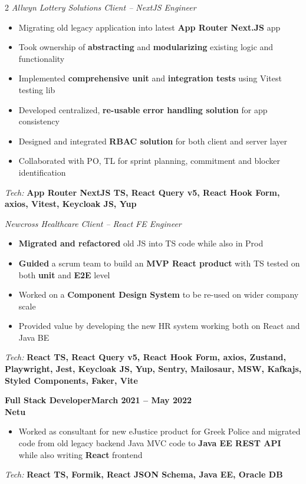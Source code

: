 \documentclass[10pt,a4paper]{article}
\newcommand{\jobentry}[4]{%
    \par\vspace{4pt}%
    \noindent\textbf{#1}\hfill\textbf{#2}\\%
    \textbf{#3}\\%
    \textit{#4}\par\vspace{2pt}%
}
\newenvironment{cvitems}{%
    \begin{itemize}[leftmargin=1.1em,topsep=2pt,itemsep=1pt,parsep=0pt]%
}{%
    \end{itemize}%
}
\newcommand{\techstack}[1]{%
    \vspace{2pt}\noindent\textit{Tech:} \textbf{#1}\par%
}
\begin{document}
\begin{paracol}{2}
\textit{Allwyn Lottery Solutions Client -- NextJS Engineer}
\begin{cvitems}
    \item Migrating old legacy application into latest \textbf{App Router Next.JS} app
    \item Took ownership of \textbf{abstracting} and \textbf{modularizing} existing logic and functionality
    \item Implemented \textbf{comprehensive unit} and \textbf{integration tests} using Vitest testing lib
    \item Developed centralized, \textbf{re-usable error handling solution} for app consistency
    \item Designed and integrated \textbf{RBAC solution} for both client and server layer
    \item Collaborated with PO, TL for sprint planning, commitment and blocker identification
\end{cvitems}
\techstack{App Router NextJS TS, React Query v5, React Hook Form, axios, Vitest, Keycloak JS, Yup}

\textit{Newcross Healthcare Client -- React FE Engineer}
\begin{cvitems}
    \item \textbf{Migrated and refactored} old JS into TS code while also in Prod
    \item \textbf{Guided} a scrum team to build an \textbf{MVP React product} with TS tested on both \textbf{unit} and \textbf{E2E} level
    \item Worked on a \textbf{Component Design System} to be re-used on wider company scale
    \item Provided value by developing the new HR system working both on React and Java BE
\end{cvitems}
\techstack{React TS, React Query v5, React Hook Form, axios, Zustand, Playwright, Jest, Keycloak JS, Yup, Sentry, Mailosaur, MSW, Kafkajs, Styled Components, Faker, Vite}

\jobentry{Full Stack Developer}{March 2021 -- May 2022}{Netu}{}
\begin{cvitems}
    \item Worked as consultant for new eJustice product for Greek Police and migrated code from old legacy backend Java MVC code to \textbf{Java EE REST API} while also writing \textbf{React} frontend
\end{cvitems}
\techstack{React TS, Formik, React JSON Schema, Java EE, Oracle DB}


\end{paracol}
\end{document}
